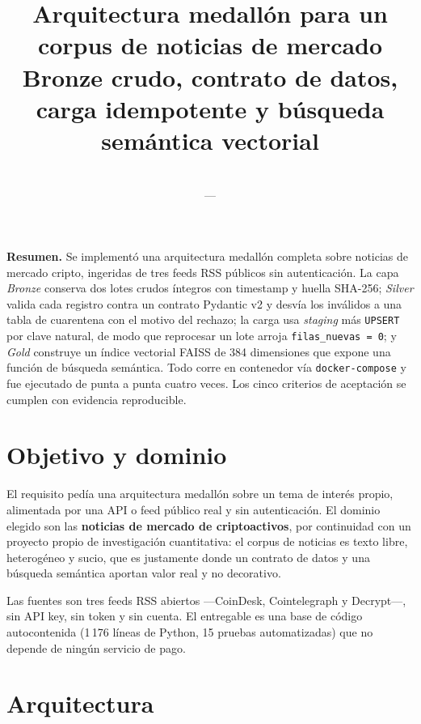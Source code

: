 \documentclass[11pt,a4paper]{article}
\title{\vspace{-1.5cm}\textbf{Arquitectura medallón para un corpus de noticias
de mercado}\\[0.3em]\large Bronze crudo, contrato de datos, carga idempotente
y búsqueda semántica vectorial}
\author{\Autora \\ \small \Materia\ ---\ \Institucion}
\date{\Fecha}
\begin{document}
\maketitle

\begin{caja}
\textbf{Resumen.} Se implementó una arquitectura medallón completa sobre
noticias de mercado cripto, ingeridas de tres feeds RSS públicos sin
autenticación. La capa \emph{Bronze} conserva dos lotes crudos íntegros con
timestamp y huella SHA-256; \emph{Silver} valida cada registro contra un
contrato Pydantic v2 y desvía los inválidos a una tabla de cuarentena con el
motivo del rechazo; la carga usa \emph{staging} más \texttt{UPSERT} por clave
natural, de modo que reprocesar un lote arroja \texttt{filas\_nuevas = 0}; y
\emph{Gold} construye un índice vectorial FAISS de 384 dimensiones que expone
una función de búsqueda semántica. Todo corre en contenedor vía
\texttt{docker-compose} y fue ejecutado de punta a punta cuatro veces. Los cinco
criterios de aceptación se cumplen con evidencia reproducible.
\end{caja}

\section{Objetivo y dominio}

El requisito pedía una arquitectura medallón sobre un tema de interés propio,
alimentada por una API o feed público real y sin autenticación. El dominio
elegido son las \textbf{noticias de mercado de criptoactivos}, por continuidad
con un proyecto propio de investigación cuantitativa: el corpus de noticias es
texto libre, heterogéneo y sucio, que es justamente donde un contrato de datos y
una búsqueda semántica aportan valor real y no decorativo.

Las fuentes son tres feeds RSS abiertos ---CoinDesk, Cointelegraph y
Decrypt---, sin API key, sin token y sin cuenta. El entregable es una base de
código autocontenida (1\,176 líneas de Python, 15 pruebas automatizadas) que no
depende de ningún servicio de pago.

\section{Arquitectura}
\end{document}
